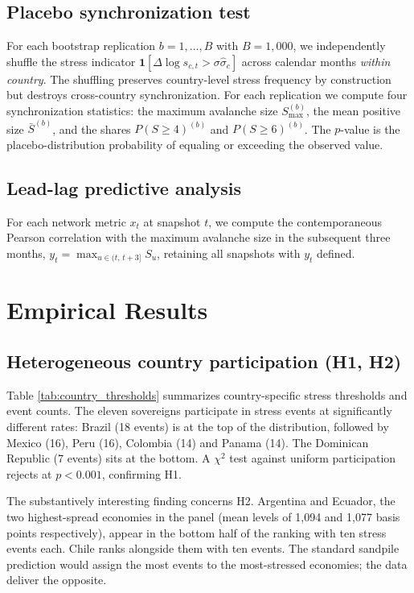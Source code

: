 \documentclass[12pt,a4paper]{article}
\newcommand{\dlogs}{\Delta\log s}
\newcommand{\Stmax}{S_{\max}}
\begin{document}
\subsection{Placebo synchronization test}
For each bootstrap replication $b=1,\dots,B$ with $B=1{,}000$, we
independently shuffle the stress indicator $\mathbf{1}[\dlogs_{c,t}>\sigma\hat{\sigma}_c]$
across calendar months \emph{within country}. The shuffling preserves
country-level stress frequency by construction but destroys cross-country
synchronization. For each replication we compute four synchronization
statistics: the maximum avalanche size $\Stmax^{(b)}$, the mean positive size
$\bar{S}^{(b)}$, and the shares $P(S\geq 4)^{(b)}$ and $P(S\geq 6)^{(b)}$. The
$p$-value is the placebo-distribution probability of equaling or exceeding
the observed value.

\subsection{Lead-lag predictive analysis}
For each network metric $x_t$ at snapshot $t$, we compute the
contemporaneous Pearson correlation with the maximum avalanche size in the
subsequent three months,
$y_t = \max_{u\in (t,\,t+3]} S_u$, retaining all snapshots with $y_t$
defined.

\section{Empirical Results}
\label{sec:results}

\subsection{Heterogeneous country participation (H1, H2)}

Table \ref{tab:country_thresholds} summarizes country-specific stress
thresholds and event counts. The eleven sovereigns participate in stress
events at significantly different rates: Brazil (18 events) is at the top of
the distribution, followed by Mexico (16), Peru (16), Colombia (14) and
Panama (14). The Dominican Republic (7 events) sits at the bottom. A
$\chi^2$ test against uniform participation rejects at $p<0.001$, confirming
H1.



The substantively interesting finding concerns H2. Argentina and Ecuador,
the two highest-spread economies in the panel (mean levels of 1{,}094 and
1{,}077 basis points respectively), appear in the bottom half of the
ranking with ten stress events each. Chile ranks alongside them with ten
events. The standard sandpile prediction would assign the most events to
the most-stressed economies; the data deliver the opposite.
\end{document}
